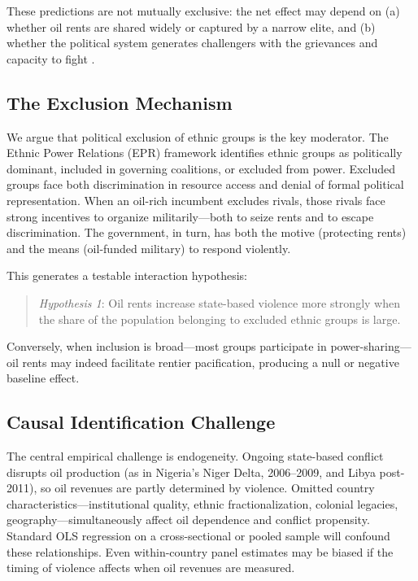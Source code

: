 \documentclass[12pt]{article}
\begin{document}
These predictions are not mutually exclusive:
the net effect may depend on (a) whether oil rents are shared widely or
captured by a narrow elite, and (b) whether the political system generates
challengers with the grievances and capacity to fight
\citep{lujala2010spoils}.

\subsection{The Exclusion Mechanism}

We argue that political exclusion of ethnic groups is the key moderator.
The Ethnic Power Relations (EPR) framework \citep{cederman2010ethno} identifies
ethnic groups as politically dominant, included in governing coalitions,
or excluded from power.
Excluded groups face both discrimination in resource access and denial of
formal political representation.
When an oil-rich incumbent excludes rivals, those rivals face
strong incentives to organize militarily---both to seize rents and
to escape discrimination.
The government, in turn, has both the motive (protecting rents) and the means
(oil-funded military) to respond violently.

This generates a testable interaction hypothesis:
\begin{quote}
\textit{Hypothesis 1}: Oil rents increase state-based violence more strongly
when the share of the population belonging to excluded ethnic groups is large.
\end{quote}

Conversely, when inclusion is broad---most groups participate in power-sharing---
oil rents may indeed facilitate rentier pacification,
producing a null or negative baseline effect.

\subsection{Causal Identification Challenge}

The central empirical challenge is endogeneity.
Ongoing state-based conflict disrupts oil production
(as in Nigeria's Niger Delta, 2006--2009, and Libya post-2011),
so oil revenues are partly determined by violence.
Omitted country characteristics---institutional quality, ethnic
fractionalization, colonial legacies, geography---simultaneously
affect oil dependence and conflict propensity.
Standard OLS regression on a cross-sectional or pooled sample
will confound these relationships.
Even within-country panel estimates may be biased if
the timing of violence affects when oil revenues are measured.
\end{document}
